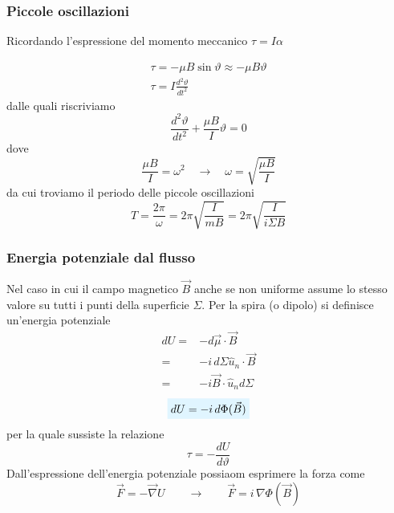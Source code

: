 \documentclass[x11names]{report}
\newcommand{\viola}[1]{%
	\colorbox{myblue}{$\displaystyle #1$}
}
\begin{document}
\subsubsection{Piccole oscillazioni}
Ricordando l'espressione del momento meccanico \(\tau = I\alpha\) 

\begin{gather}
	\tau = -\mu B \sin\vartheta \approx -\mu B \vartheta \\
	\tau = I\frac{d^2\vartheta}{dt^2}
\end{gather}
dalle quali riscriviamo
\[
\frac{d^2\vartheta}{dt^2} + \frac{\mu B}{I} \vartheta = 0
\]
dove
\[
\frac{\mu B}{I} = \omega^2 \quad \to \quad \omega = \sqrt{\frac{\mu B}{I}}
\]
da cui troviamo il periodo delle piccole oscillazioni
\[
T = \frac{2\pi}{\omega} = 2\pi \sqrt{\frac{I}{mB}} = 2\pi \sqrt{\frac{I}{i\Sigma B}}
\]

\subsubsection{Energia potenziale dal flusso}
Nel caso in cui il campo magnetico \(\vec{B}\) anche se non uniforme assume lo stesso valore su tutti i punti della superficie \(\Sigma\). Per la spira (o dipolo) si definisce un'energia potenziale
\begin{align*}
	dU =& -d\vec{\mu}\cdot\vec{B} \\
	=& -i \, d\Sigma \hat{u}_n \cdot \vec{B} \\
	=& -i\vec{B}\cdot \hat{u}_n  d\Sigma
\end{align*}
\begin{equation}
	\viola{dU =-i \, d\Phi(\vec{B})}
\end{equation}
per la quale sussiste la relazione
\[
\tau= - \frac{dU}{d\vartheta}
\]
Dall'espressione dell'energia potenziale possiaom esprimere la forza come 
\[
\vec{F} = -\vec{\nabla} U \qquad  \to \qquad \vec{F} = i \, \nabla\Phi(\vec{B})
\]
\end{document}
